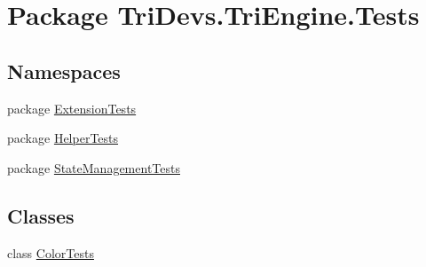 \hypertarget{namespace_tri_devs_1_1_tri_engine_1_1_tests}{\section{Package Tri\-Devs.\-Tri\-Engine.\-Tests}
\label{namespace_tri_devs_1_1_tri_engine_1_1_tests}
}
\subsection*{Namespaces}
\begin{DoxyCompactItemize}
\item 
package \hyperlink{namespace_tri_devs_1_1_tri_engine_1_1_tests_1_1_extension_tests}{Extension\-Tests}
\item 
package \hyperlink{namespace_tri_devs_1_1_tri_engine_1_1_tests_1_1_helper_tests}{Helper\-Tests}
\item 
package \hyperlink{namespace_tri_devs_1_1_tri_engine_1_1_tests_1_1_state_management_tests}{State\-Management\-Tests}
\end{DoxyCompactItemize}
\subsection*{Classes}
\begin{DoxyCompactItemize}
\item 
class \hyperlink{class_tri_devs_1_1_tri_engine_1_1_tests_1_1_color_tests}{Color\-Tests}
\end{DoxyCompactItemize}
